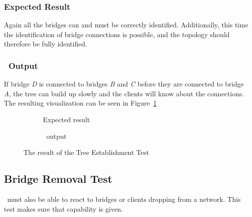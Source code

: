 \subsubsection*{Expected Result}
Again all the bridges can and must be correctly identified.
Additionally, this time the identification of bridge connections is possible, and the topology should therefore be fully identified.

\subsubsection*{\tool\ Output}
If bridge \textit{D} is connected to bridges \textit{B} and \textit{C} before they are connected to bridge \textit{A}, the tree can build up slowly and the clients will know about the connections.
The resulting visualization can be seen in Figure~\ref{fig:est}
\begin{figure}[h]
    \begin{subfigure}[b]{\textwidth}
        \centering
            \caption{Expected result}
    \end{subfigure}

    \vspace{0.5cm}

    \begin{subfigure}[b]{\textwidth}
        \centering
        
        \caption{\tool\ output}
    \end{subfigure}
    \caption{The result of the Tree Establishment Test}
    \label{fig:est}
\end{figure}

\subsection*{Bridge Removal Test}
\label{removal_test}
\tool\ must also be able to react to bridges or clients dropping from a network.
This test makes sure that capability is given.

